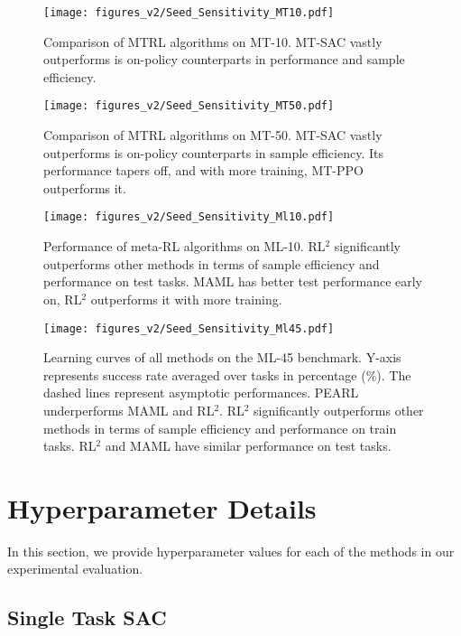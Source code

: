 \begin{figure}[H]
    \centering
    \texttt{[image: figures\_v2/Seed\_Sensitivity\_MT10.pdf]}
    \caption{Comparison of MTRL algorithms on MT-10. MT-SAC vastly outperforms is on-policy counterparts in performance and sample efficiency.}
    \label{fig:learningcurves}
\end{figure}
\begin{figure}[H]
    \centering
    \texttt{[image: figures\_v2/Seed\_Sensitivity\_MT50.pdf]}
    \vspace{-0.5cm}
    \caption{Comparison of MTRL algorithms on MT-50. MT-SAC vastly outperforms is on-policy counterparts in sample efficiency. Its performance tapers off, and with more training, MT-PPO outperforms it.}
    \label{fig:mt50-curve}
\end{figure}
\begin{figure}[H]
    \vspace{-2.5cm}
    \centering
    \texttt{[image: figures\_v2/Seed\_Sensitivity\_Ml10.pdf]}
    \caption{Performance of meta-RL algorithms on ML-10. RL$^2$ significantly outperforms other methods in terms of sample efficiency and performance on test tasks. MAML has better test performance early on, RL$^2$ outperforms it with more training.}
    \label{fig:ml10-curve}
\end{figure}
\begin{figure}[H]
\centering
    \texttt{[image: figures\_v2/Seed\_Sensitivity\_Ml45.pdf]}
    \caption{Learning curves of all methods on the ML-45 benchmark. Y-axis represents success rate averaged over tasks in percentage (\%). The dashed lines represent asymptotic performances. PEARL underperforms MAML and RL$^2$. RL$^2$ significantly outperforms other methods in terms of sample efficiency and performance on train tasks. RL$^2$ and MAML have similar performance on test tasks.}
    \label{fig:ml45-curve}
\end{figure}
\pagebreak{}

\section{Hyperparameter Details}
\label{app:hyperparameters}

In this section, we provide hyperparameter values for each of the methods in our experimental evaluation.

\subsection{Single Task SAC}

